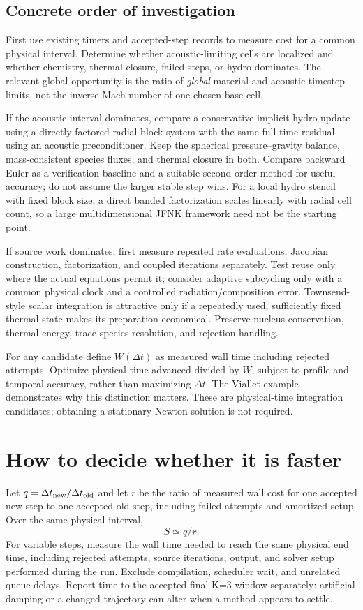 \documentclass[english,a4paper]{my_memo}
\begin{document}
\subsection{Concrete order of investigation}
First use existing timers and accepted-step records to measure cost for a common physical interval. Determine whether acoustic-limiting cells are localized and whether chemistry, thermal closure, failed steps, or hydro dominates. The relevant global opportunity is the ratio of \emph{global} material and acoustic timestep limits, not the inverse Mach number of one chosen base cell.

If the acoustic interval dominates, compare a conservative implicit hydro update using a directly factored radial block system with the same full time residual using an acoustic preconditioner. Keep the spherical pressure--gravity balance, mass-consistent species fluxes, and thermal closure in both. Compare backward Euler as a verification baseline and a suitable second-order method for useful accuracy; do not assume the larger stable step wins. For a local hydro stencil with fixed block size, a direct banded factorization scales linearly with radial cell count, so a large multidimensional JFNK framework need not be the starting point.

If source work dominates, first measure repeated rate evaluations, Jacobian construction, factorization, and coupled iterations separately. Test reuse only where the actual equations permit it; consider adaptive subcycling only with a common physical clock and a controlled radiation/composition error. Townsend-style scalar integration is attractive only if a repeatedly used, sufficiently fixed thermal state makes its preparation economical. Preserve nucleus conservation, thermal energy, trace-species resolution, and rejection handling.

For any candidate define $W(\Delta t)$ as measured wall time including rejected attempts. Optimize physical time advanced divided by $W$, subject to profile and temporal accuracy, rather than maximizing $\Delta t$. The Viallet example demonstrates why this distinction matters. These are physical-time integration candidates; obtaining a stationary Newton solution is not required.

\section{How to decide whether it is faster}
Let $q=\Delta t_{\rm new}/\Delta t_{\rm old}$ and let $r$ be the ratio of measured wall cost for one accepted new step to one accepted old step, including failed attempts and amortized setup. Over the same physical interval,
\begin{equation}
 S\simeq q/r.
\end{equation}
For variable steps, measure the wall time needed to reach the same physical end time, including rejected attempts, source iterations, output, and solver setup performed during the run. Exclude compilation, scheduler wait, and unrelated queue delays. Report time to the accepted final K=3 window separately: artificial damping or a changed trajectory can alter when a method appears to settle.
\end{document}
